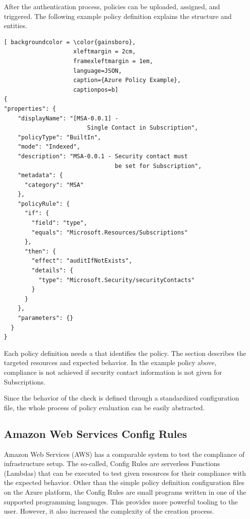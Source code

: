 After the authentication process, policies can be uploaded, assigned, and triggered. The following example policy definition explains the structure and entities.

\vskip 1cm

\begin{lstlisting}[ backgroundcolor = \color{gainsboro}, 
                    xleftmargin = 2cm, 
                    framexleftmargin = 1em, 
                    language=JSON,
                    caption={Azure Policy Example},
                    captionpos=b]
{
"properties": {
    "displayName": "[MSA-0.0.1] - 
                        Single Contact in Subscription",
    "policyType": "BuiltIn",
    "mode": "Indexed",
    "description": "MSA-0.0.1 - Security contact must 
                                be set for Subscription",
    "metadata": {
      "category": "MSA"
    },
    "policyRule": {
      "if": {
        "field": "type",
        "equals": "Microsoft.Resources/Subscriptions"
      },
      "then": {
        "effect": "auditIfNotExists",
        "details": {
          "type": "Microsoft.Security/securityContacts"
        }
      }
    },
    "parameters": {}
  }
}
\end{lstlisting}

Each policy definition needs a  that identifies the policy. The  section describes the targeted resources and expected behavior. In the example policy above, compliance is not achieved if security contact information is not given for Subscriptions.

Since the behavior of the check is defined through a standardized configuration file, the whole process of policy evaluation can be easily abstracted. 


\subsection{Amazon Web Services Config Rules}
\label{awsConfigRules}
Amazon Web Services (AWS) has a comparable system to test the compliance of infrastructure setup. The so-called, Config Rules are serverless Functions (Lambdas) that can be executed to test given resources for their compliance with the expected behavior.
Other than the simple policy definition configuration files on the Azure platform, the Config Rules are small programs written in one of the supported programming languages. This provides more powerful tooling to the user. However, it also increased the complexity of the creation process.


